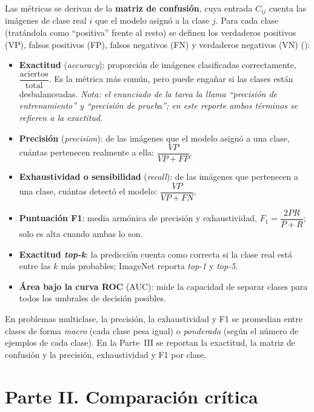 \documentclass[11pt,letterpaper]{article}
\makeatletter
\newcommand{\cit@chk}[1]{\ifcsdef{citA@#1}{}{\PackageError{citas}{Cita no definida: #1}{}}}
\newcommand{\cit@item}[1]{\cit@chk{#1}\cit@sep\csuse{citA@#1}, \csuse{citY@#1}\gdef\cit@sep{; }}
\newcommand{\parencite}[1]{(\gdef\cit@sep{}\forcsvlist{\cit@item}{#1})}
\makeatother
\begin{document}
Las métricas se derivan de la \textbf{matriz de confusión}, cuya entrada $C_{ij}$ cuenta las imágenes de clase real $i$ que el modelo asignó a la clase $j$. Para cada clase (tratándola como ``positiva'' frente al resto) se definen los verdaderos positivos (VP), falsos positivos (FP), falsos negativos (FN) y verdaderos negativos (VN) \parencite{sokolova2009}:
\begin{itemize}
  \item \textbf{Exactitud} (\emph{accuracy}): proporción de imágenes clasificadas correctamente, $\dfrac{\text{aciertos}}{\text{total}}$. Es la métrica más común, pero puede engañar si las clases están desbalanceadas. \emph{Nota: el enunciado de la tarea la llama ``precisión de entrenamiento'' y ``precisión de prueba''; en este reporte ambos términos se refieren a la exactitud.}
  \item \textbf{Precisión} (\emph{precision}): de las imágenes que el modelo asignó a una clase, cuántas pertenecen realmente a ella: $\dfrac{VP}{VP+FP}$.
  \item \textbf{Exhaustividad o sensibilidad} (\emph{recall}): de las imágenes que pertenecen a una clase, cuántas detectó el modelo: $\dfrac{VP}{VP+FN}$.
  \item \textbf{Puntuación F1}: media armónica de precisión y exhaustividad, $F_1 = \dfrac{2PR}{P+R}$; solo es alta cuando ambas lo son.
  \item \textbf{Exactitud \emph{top-k}}: la predicción cuenta como correcta si la clase real está entre las $k$ más probables; ImageNet reporta \emph{top-1} y \emph{top-5}.
  \item \textbf{Área bajo la curva ROC} (AUC): mide la capacidad de separar clases para todos los umbrales de decisión posibles.
\end{itemize}
En problemas multiclase, la precisión, la exhaustividad y F1 se promedian entre clases de forma \emph{macro} (cada clase pesa igual) o \emph{ponderada} (según el número de ejemplos de cada clase). En la Parte~III se reportan la exactitud, la matriz de confusión y la precisión, exhaustividad y F1 por clase.

\clearpage
\section{Parte II. Comparación crítica}
\end{document}
